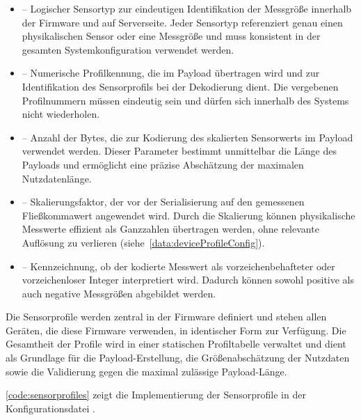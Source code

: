 	\begin{itemize}
		\item {} – Logischer Sensortyp zur eindeutigen Identifikation der Messgrö{\ss}e innerhalb der Firmware und auf Serverseite. Jeder Sensortyp referenziert genau einen physikalischen Sensor oder eine Messgrö{\ss}e und muss konsistent in der gesamten Systemkonfiguration verwendet werden.
		
		\item {} – Numerische Profilkennung, die im Payload übertragen wird und zur Identifikation des Sensorprofils bei der Dekodierung dient. Die vergebenen Profilnummern müssen eindeutig sein und dürfen sich innerhalb des Systems nicht wiederholen.
		
		\item {} – Anzahl der Bytes, die zur Kodierung des skalierten Sensorwerts im Payload verwendet werden. Dieser Parameter bestimmt unmittelbar die Länge des Payloads und ermöglicht eine präzise Abschätzung der maximalen Nutzdatenlänge.
		
		\item {} – Skalierungsfaktor, der vor der Serialisierung auf den gemessenen Flie{\ss}kommawert angewendet wird. Durch die Skalierung können physikalische Messwerte effizient als Ganzzahlen übertragen werden, ohne relevante Auflösung zu verlieren (siehe~\autoref{data:deviceProfileConfig}).
		
		\item {} – Kennzeichnung, ob der kodierte Messwert als vorzeichenbehafteter oder vorzeichenloser Integer interpretiert wird. Dadurch können sowohl positive als auch negative Messgrö{\ss}en abgebildet werden.
	\end{itemize}
	
	Die Sensorprofile werden zentral in der Firmware definiert und stehen allen Geräten, die diese Firmware verwenden, in identischer Form zur Verfügung. Die Gesamtheit der Profile wird in einer statischen Profiltabelle verwaltet und dient als Grundlage für die Payload-Erstellung, die Grö{\ss}enabschätzung der Nutzdaten sowie die Validierung gegen die maximal zulässige Payload-Länge.
	
	\autoref{code:sensorprofiles} zeigt die Implementierung der Sensorprofile in der Konfigurationsdatei .
	{
		\label{code:sensorprofiles}
	}
	
